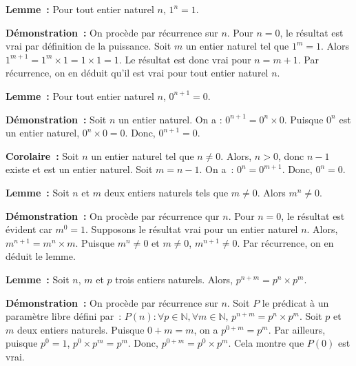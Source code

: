 \medskip

\noindent\textbf{Lemme :} Pour tout entier naturel $n$, $1^n = 1$.

\medskip

\noindent\textbf{Démonstration :} On procède par récurrence sur $n$. 
    Pour $n = 0$, le résultat est vrai par définition de la puissance.
    Soit $m$ un entier naturel tel que $1^m = 1$. 
    Alors $1^{m+1} = 1^m \times 1 = 1 \times 1 = 1$. 
    Le résultat est donc vrai pour $n = m+1$. 
    Par récurrence, on en déduit qu'il est vrai pour tout entier naturel $n$.

   \done 

\medskip

\noindent\textbf{Lemme :} Pour tout entier naturel $n$, $0^{n+1} = 0$. 

\medskip

\noindent\textbf{Démonstration :} Soit $n$ un entier naturel. 
    On a : $0^{n+1} = 0^n \times 0$. 
    Puisque $0^n$ est un entier naturel, $0^n \times 0 = 0$. 
    Donc, $0^{n+1} = 0$.

   \done 
\medskip

\noindent\textbf{Corolaire :} 
    Soit $n$ un entier naturel tel que $n \neq 0$. 
    Alors, $n > 0$, donc $n - 1$ existe et est un entier naturel.
    Soit $m = n - 1$. 
    On a : $0^n = 0^{m + 1}$. 
    Donc, $0^n = 0$.

\medskip

\noindent\textbf{Lemme :} Soit $n$ et $m$ deux entiers naturels tels que $m \neq 0$. 
    Alors $m^n \neq 0$.

\medskip

\noindent\textbf{Démonstration :} On procède par récurrence qur $n$. 
    Pour $n = 0$, le résultat est évident car $m^0 = 1$. 
    Supposons le résultat vrai pour un entier naturel $n$. 
    Alors, $m^{n+1} = m^n \times m$. 
    Puisque $m^n \neq 0$ et $m \neq 0$, $m^{n+1} \neq 0$. 
    Par récurrence, on en déduit le lemme.

   \done 

\medskip

\noindent\textbf{Lemme :} Soit $n$, $m$ et $p$ trois entiers naturels. 
    Alors, $p^{n+m} = p^n \times p^m$.

\medskip

\noindent\textbf{Démonstration :} On procède par récurrence sur $n$. 
    Soit $P$ le prédicat à un paramètre libre défini par : $P(n): \forall p \in \mathbb{N}, \forall m \in \mathbb{N}, \, p^{n+m} = p^n \times p^m$. 
    Soit $p$ et $m$ deux entiers naturels. 
    Puisque $0 + m = m$, on a $p^{0 + m} = p^m$. 
    Par ailleurs, puisque $p^0 = 1$, $p^0 \times p^m = p^m$. 
    Donc, $p^{0+m} = p^0 \times p^m$. 
    Cela montre que $P(0)$ est vrai. 

